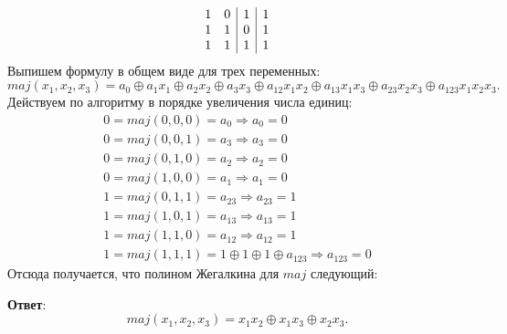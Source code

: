 \begin{enumerate}
\begin{solution}
\begin{displaymath}
\begin{array}{c c|c|c}
        1 & 0 & 1 & 1\\
        1 & 1 & 0 & 1\\
        1 & 1 & 1 & 1
      \end{array}
      \end{displaymath}
    Выпишем формулу в общем виде для трех переменных:
    \begin{equation}
      maj(x_1,x_2,x_3)=a_0 \oplus a_1x_1 \oplus a_2x_2 \oplus a_3x_3 \oplus a_{12}x_1x_2 \oplus a_{13}x_1x_3 \oplus a_{23}x_2x_3 \oplus a_{123}x_1x_2x_3.
    \end{equation}
    Действуем по алгоритму в порядке увеличения числа единиц:
    \begin{eqnarray}
      0=maj(0,0,0)=a_0 \Rightarrow a_0 = 0 \\
      0=maj(0,0,1)=a_3 \Rightarrow a_3 = 0 \\
      0=maj(0,1,0)=a_2 \Rightarrow a_2 = 0 \\
      0=maj(1,0,0)=a_1 \Rightarrow a_1 = 0 \\
      1=maj(0,1,1)=a_{23} \Rightarrow a_{23} = 1 \\
      1=maj(1,0,1)=a_{13} \Rightarrow a_{13} = 1 \\
      1=maj(1,1,0)=a_{12} \Rightarrow a_{12} = 1 \\
      1=maj(1,1,1)=1\oplus 1\oplus 1\oplus a_{123} \Rightarrow a_{123} = 0
    \end{eqnarray}
    Отсюда получается, что полином Жегалкина для $maj$ следующий:
    
    \textbf{Ответ}:
    \begin{equation}
      maj(x_1,x_2,x_3)=x_1x_2\oplus x_1x_3\oplus x_2x_3.
    \end{equation}
  \end{solution}
\end{enumerate}

\clearpage
